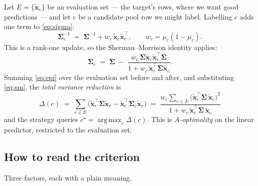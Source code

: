 \documentclass[11pt]{article}
\newcommand{\bx}{\bm{x}}
\newcommand{\bS}{\bm{\Sigma}}
\DeclareMathOperator*{\argmax}{arg\,max}
\begin{document}
Let $E = \{\tilde{\bx}_e\}$ be an evaluation set --- the target's rows, where we want good
predictions --- and let $c$ be a candidate pool row we might label. Labelling $c$ adds one term
to \eqref{eq:sigma}:
\begin{equation}
  \bS_c^{-1} \;=\; \bS^{-1} + w_c\,\tilde{\bx}_c\tilde{\bx}_c^{\!\top},
  \qquad w_c = \mu_c(1-\mu_c).
  \label{eq:rank1}
\end{equation}
This is a rank-one update, so the Sherman--Morrison identity applies:
\begin{equation}
  \bS_c \;=\; \bS \;-\; \frac{w_c\, \bS \tilde{\bx}_c \tilde{\bx}_c^{\!\top} \bS}
                             {1 + w_c\, \tilde{\bx}_c^{\!\top}\bS\tilde{\bx}_c}.
  \label{eq:sm}
\end{equation}
Summing \eqref{eq:epi} over the evaluation set before and after, and substituting \eqref{eq:sm},
the \emph{total variance reduction} is
\begin{equation}
  \boxed{\;
  \Delta(c) \;=\; \sum_{e\in E}\Big(\tilde{\bx}_e^{\!\top}\bS\tilde{\bx}_e
                                   - \tilde{\bx}_e^{\!\top}\bS_c\tilde{\bx}_e\Big)
            \;=\; \frac{w_c \displaystyle\sum_{e\in E}
                        \big(\tilde{\bx}_e^{\!\top}\bS\,\tilde{\bx}_c\big)^{2}}
                       {1 + w_c\,\tilde{\bx}_c^{\!\top}\bS\,\tilde{\bx}_c} \; }
  \label{eq:crit}
\end{equation}
and the strategy queries $c^\star = \argmax_{c} \Delta(c)$. This is \emph{A-optimality} on the
linear predictor, restricted to the evaluation set.

\subsection{How to read the criterion}

Three factors, each with a plain meaning.
\end{document}
